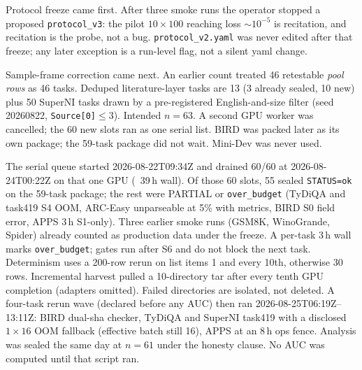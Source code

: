 Protocol freeze came first. After three smoke runs the operator
stopped a proposed \texttt{protocol\_v3}: the pilot
$10{\times}100$ reaching loss $\sim 10^{-5}$ is recitation, and
recitation is the probe, not a bug. \texttt{protocol\_v2.yaml} was
never edited after that freeze; any later exception is a run-level
flag, not a silent yaml change.

Sample-frame correction came next. An earlier count treated 46
retestable \emph{pool rows} as 46 tasks. Deduped literature-layer
tasks are 13 (3 already sealed, 10 new) plus 50 SuperNI tasks
drawn by a pre-registered English-and-size filter (seed 20260822,
\texttt{Source[0]}$\le 3$). Intended $n{=}63$. A second GPU worker
was cancelled; the 60 new slots ran as one serial list.
BIRD was packed later as its own package; the 59-task package did
not wait. Mini-Dev was never used.

The serial queue started 2026-08-22T09:34Z and drained 60/60 at
2026-08-24T00:22Z on that one GPU (~39\,h wall).
Of those 60 slots, 55 sealed \texttt{STATUS=ok} on the 59-task
package; the rest were PARTIAL or \texttt{over\_budget} (TyDiQA
and task419 S4 OOM, ARC-Easy unparseable at 5\% with metrics,
BIRD S0 field error, APPS 3\,h S1-only). Three earlier smoke
runs (GSM8K, WinoGrande, Spider) already counted as production
data under the freeze.
A per-task 3\,h wall marks \texttt{over\_budget}; gates run after
S6 and do not block the next task. Determinism uses a 200-row
rerun on list items 1 and every 10th, otherwise 30 rows.
Incremental harvest pulled a 10-directory tar after every tenth
GPU completion (adapters omitted). Failed directories are isolated,
not deleted.
A four-task rerun wave (declared before any AUC) then ran
2026-08-25T06:19Z--13:11Z: BIRD dual-sha checker, TyDiQA and
SuperNI task419 with a disclosed $1{\times}16$ OOM fallback
(effective batch still 16), APPS at an 8\,h ops fence.
Analysis was sealed the same day at $n{=}61$ under the honesty
clause. No AUC was computed until that script ran.

